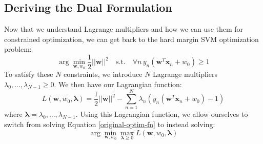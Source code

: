 \subsection{Deriving the Dual Formulation}
Now that we understand Lagrange multipliers and how we can use them for constrained optimization, we can get back to the hard margin SVM optimization problem:
\begin{equation} \label{original-optim-fn}
	\arg\min_{\textbf{w}, w_{0}} \frac{1}{2} ||\textbf{w}||^{2} \quad \text{s.t.} \quad \forall n \, y_{n}(\textbf{w}^{T}\textbf{x}_{n} + w_{0}) \geq 1
\end{equation}
To satisfy these $N$ constraints, we introduce $N$ Lagrange multipliers $\lambda_{0}, ..., \lambda_{N-1} \geq 0$. We then have our Lagrangian function:
\begin{equation} \label{lagrange-equation}
	L(\textbf{w}, w_{0}, \boldsymbol{\lambda}) = \frac{1}{2} ||\textbf{w}||^{2} - \sum_{n=1}^{N} \lambda_{n} (y_{n}(\textbf{w}^{T} \textbf{x}_{n} + w_{0}) - 1)
\end{equation}
where $\boldsymbol{\lambda} = \lambda_{0}, ..., \lambda_{N-1}$. Using this Lagrangian function, we allow ourselves to switch from solving Equation \ref{original-optim-fn} to instead solving:
\begin{equation} \label{new-optim-fn}
	\arg\min_{\textbf{w}, w_{0}} \max_{\boldsymbol{\lambda} \geq 0} L(\textbf{w}, w_{0}, \boldsymbol{\lambda})
\end{equation}


